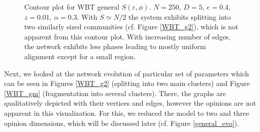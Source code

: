 \documentclass[11pt]{article}
\begin{document}
\begin{figure}[!htb]
    \centering
    \caption{Contour plot for WBT general $S(\varepsilon,\phi)$. $N=250$, $D=5$, $e=0.4$, $z=0.01$, $\alpha=0.3$. With $S \simeq N/2$ the system exhibits splitting into two similarly sized communities (cf. Figure \ref{WBT_g2}), which is not apparent from this contour plot. With increasing number of edges, the network exhibits less phases leading to mostly uniform alignment except for a small region.}
    \label{wbt_cont}
\end{figure}

Next, we looked at the network evolution of particular set of parameters which can be seen in Figures \ref{WBT_g2} (splitting into two main clusters) and Figure \ref{WBT_gm} (fragmentation into several clusters). There, the graphs are qualitatively depicted with their vertices and edges, however the opinions are not apparent in this visualization. For this, we reduced the model to two and three opinion dimensions, which will be discussed later (cf. Figure \ref{general_evo}). 
\end{document}
